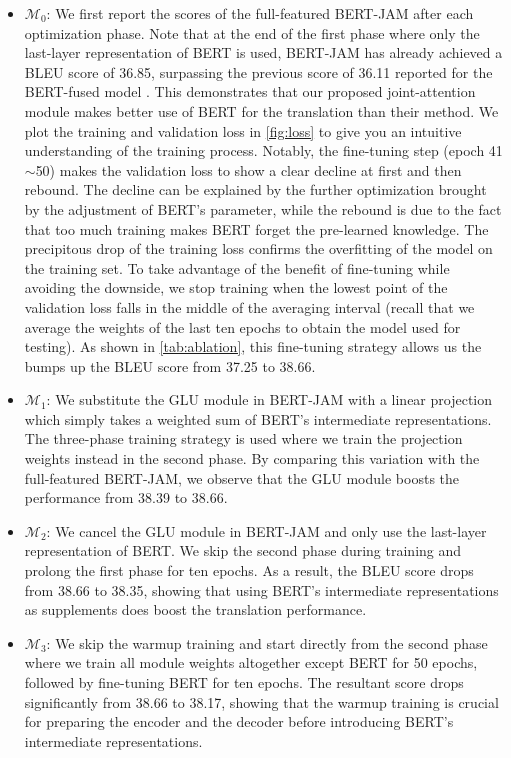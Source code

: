 \documentclass[review]{elsarticle}
\begin{document}
\begin{itemize}
    \item $\mathcal{M}_0$: We first report the scores of the full-featured BERT-JAM after each optimization phase. Note that at the end of the first phase where only the last-layer representation of BERT is used, BERT-JAM has already achieved a BLEU score of 36.85, surpassing the previous score of 36.11 reported for the BERT-fused model \cite{Zhu20}. This demonstrates that our proposed joint-attention module makes better use of BERT for the translation than their method. 
    We plot the training and validation loss in \cref{fig:loss} to give you an intuitive understanding of the training process. Notably, the fine-tuning step (epoch 41$\sim$50) makes the validation loss to show a clear decline at first and then rebound. The decline can be explained by the further optimization brought by the adjustment of BERT's parameter, while the rebound is due to the fact that too much training makes BERT forget the pre-learned knowledge. The precipitous drop of the training loss confirms the overfitting of the model on the training set. To take advantage of the benefit of fine-tuning while avoiding the downside, we stop training when the lowest point of the validation loss falls in the middle of the averaging interval (recall that we average the weights of the last ten epochs to obtain the model used for testing). 
    As shown in \cref{tab:ablation}, this fine-tuning strategy allows us the bumps up the BLEU score from 37.25 to 38.66. 

    \item $\mathcal{M}_1$: We substitute the GLU module in BERT-JAM with a linear projection which simply takes a weighted sum of BERT's intermediate representations. The three-phase training strategy is used where we train the projection weights instead in the second phase. By comparing this variation with the full-featured BERT-JAM, we observe that the GLU module boosts the performance from 38.39 to 38.66.
    
    \item $\mathcal{M}_2$: We cancel the GLU module in BERT-JAM and only use the last-layer representation of BERT. We skip the second phase during training and prolong the first phase for ten epochs. As a result, the BLEU score drops from 38.66 to 38.35, showing that using BERT's intermediate representations as supplements does boost the translation performance.
    
    \item $\mathcal{M}_3$: We skip the warmup training and start directly from the second phase where we train all module weights altogether except BERT for 50 epochs, followed by fine-tuning BERT for ten epochs. The resultant score drops significantly from 38.66 to 38.17, showing that the warmup training is crucial for preparing the encoder and the decoder before introducing BERT's intermediate representations.
\end{itemize}
\end{document}
